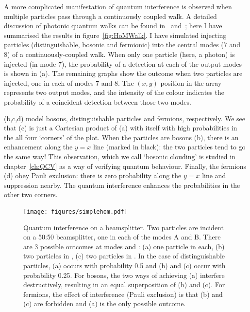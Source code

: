 A more complicated manifestation of quantum interference is observed when
multiple particles pass through a continuously coupled walk. A detailed
discussion of photonic quantum walks can be found in~\cite{walks-peruzzo}
and~\cite{walks-jasmin}; here I have summarised the results in
figure~\ref{fig:HoMWalk}. I have simulated injecting particles (distinguishable,
bosonic and fermionic) into the central modes (7 and 8) of a
continuously-coupled walk. When only one particle (here, a photon) is injected
(in mode 7), the probability of a detection at each of the output modes is shown
in (a). The remaining graphs show the outcome when two particles are injected,
one in each of modes 7 and 8. The \(\left(x,y\right)\) position in the array
represents two output modes, and the intensity of the colour indicates the
probability of a coincident detection between those two modes.

(b,c,d) model bosons, distinguishable particles and fermions,
respectively. We see that (c) is just a Cartesian product of (a) with itself
with high probabilities in the all four `corners' of the plot. When the
particles
are bosons (b), there is an enhancement along the \(y=x\) line (marked in
black): the two particles tend to go the same way! This observation, which we
call `bosonic clouding' is studied in chapter~\ref{ch:QCV} as a way of verifying
quantum behaviour. Finally, the fermions (d) obey Pauli exclusion: there is
zero probability along the \(y=x\) line and suppression nearby. The quantum
interference enhances the probabilities in the other two corners.

\begin{figure}
  \centering
  \texttt{[image: figures/simplehom.pdf]}
  \caption[Quantum interference on a beamsplitter]
  {Quantum interference on a beamsplitter. Two particles are incident on a
  50:50 beamsplitter, one in each of the modes A and B. There are 3 possible
  outcomes at modes \aprime{} and \bprime{}: (a) one particle in each,
  (b) two particles in \aprime{}, (c) two particles in \bprime{}. In
  the case of distinguishable particles, (a) occurs with probability
  0.5 and (b) and (c) occur with probability 0.25. For bosons, the two ways of
  achieving (a) interfere destructively, resulting in an equal superposition of
  (b) and (c). For fermions, the effect of interference (Pauli exclusion) is
  that (b) and (c) are forbidden and (a) is the only possible outcome.}
  \label{fig:SimpleHoM}
\end{figure}

